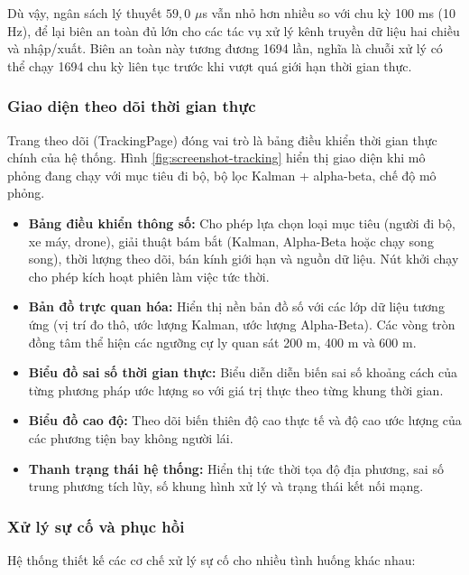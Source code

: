 Dù vậy, ngân sách lý thuyết $59{,}0$ $\mu$s vẫn nhỏ hơn nhiều so với chu kỳ 100 ms (10 Hz), để lại biên an toàn đủ lớn cho các tác vụ xử lý kênh truyền dữ liệu hai chiều và nhập/xuất. Biên an toàn này tương đương 1694 lần, nghĩa là chuỗi xử lý có thể chạy 1694 chu kỳ liên tục trước khi vượt quá giới hạn thời gian thực.

\subsubsection{Giao diện theo dõi thời gian thực}

\hspace{0.5cm} Trang theo dõi (TrackingPage) đóng vai trò là bảng điều khiển thời gian thực chính của hệ thống. Hình \ref{fig:screenshot-tracking} hiển thị giao diện khi mô phỏng đang chạy với mục tiêu đi bộ, bộ lọc Kalman + alpha-beta, chế độ mô phỏng.

\begin{itemize}
    \item \textbf{Bảng điều khiển thông số:} Cho phép lựa chọn loại mục tiêu (người đi bộ, xe máy, drone), giải thuật bám bắt (Kalman, Alpha-Beta hoặc chạy song song), thời lượng theo dõi, bán kính giới hạn và nguồn dữ liệu. Nút khởi chạy cho phép kích hoạt phiên làm việc tức thời.
    \item \textbf{Bản đồ trực quan hóa:} Hiển thị nền bản đồ số với các lớp dữ liệu tương ứng (vị trí đo thô, ước lượng Kalman, ước lượng Alpha-Beta). Các vòng tròn đồng tâm thể hiện các ngưỡng cự ly quan sát 200 m, 400 m và 600 m.
    \item \textbf{Biểu đồ sai số thời gian thực:} Biểu diễn diễn biến sai số khoảng cách của từng phương pháp ước lượng so với giá trị thực theo từng khung thời gian.
    \item \textbf{Biểu đồ cao độ:} Theo dõi biến thiên độ cao thực tế và độ cao ước lượng của các phương tiện bay không người lái.
    \item \textbf{Thanh trạng thái hệ thống:} Hiển thị tức thời tọa độ địa phương, sai số trung phương tích lũy, số khung hình xử lý và trạng thái kết nối mạng.
\end{itemize}

\subsubsection{Xử lý sự cố và phục hồi}

\hspace{0.5cm} Hệ thống thiết kế các cơ chế xử lý sự cố cho nhiều tình huống khác nhau:

